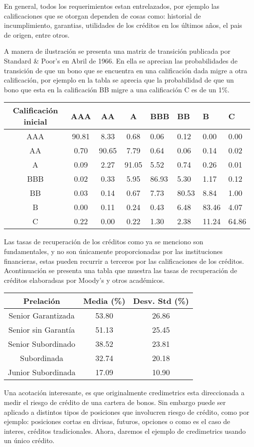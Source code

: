 \documentclass[
  12pt,
]{krantz}
\theoremstyle{definition}
\theoremstyle{definition}
\theoremstyle{definition}
\theoremstyle{remark}
\begin{document}
En general, todos los requerimientos estan entrelazados, por ejemplo las calificaciones que se otorgan dependen de cosas como: historial de incumplimiento, garantias, utilidades de los créditos en los últimos años, el pais de origen, entre otros.

A manera de ilustración se presenta una matriz de transición publicada por Standard \& Poor's en Abril de 1966. En ella se aprecian las probabilidades de transición de que un bono que se encuentra en una calificación dada migre a otra calificación, por ejemplo en la tabla se aprecia que la probabilidad de que un bono que esta en la calificación BB migre a una calificación C es de un 1\%.

\begin{longtable}[]{@{}ccccllll@{}}
\toprule
Calificación inicial & AAA & AA & A & BBB & BB & B & C\tabularnewline
\midrule
\endhead
AAA & 90.81 & 8.33 & 0.68 & 0.06 & 0.12 & 0.00 & 0.00\tabularnewline
AA & 0.70 & 90.65 & 7.79 & 0.64 & 0.06 & 0.14 & 0.02\tabularnewline
A & 0.09 & 2.27 & 91.05 & 5.52 & 0.74 & 0.26 & 0.01\tabularnewline
BBB & 0.02 & 0.33 & 5.95 & 86.93 & 5.30 & 1.17 & 0.12\tabularnewline
BB & 0.03 & 0.14 & 0.67 & 7.73 & 80.53 & 8.84 & 1.00\tabularnewline
B & 0.00 & 0.11 & 0.24 & 0.43 & 6.48 & 83.46 & 4.07\tabularnewline
C & 0.22 & 0.00 & 0.22 & 1.30 & 2.38 & 11.24 & 64.86\tabularnewline
\bottomrule
\end{longtable}

Las tasas de recuperación de los créditos como ya se menciono son fundamentales, y no son únicamente proporcionadas por las instituciones financieras, estas pueden recurrir a terceros por las calificaciones de los créditos. Acontinuación se presenta una tabla que muestra las tasas de recuperación de créditos elaboradsas por Moody's y otros académicos.

\begin{longtable}[]{@{}ccc@{}}
\toprule
Prelación & Media (\%) & Desv. Std (\%)\tabularnewline
\midrule
\endhead
Senior Garantizada & 53.80 & 26.86\tabularnewline
Senior sin Garantía & 51.13 & 25.45\tabularnewline
Senior Subordinado & 38.52 & 23.81\tabularnewline
Subordinada & 32.74 & 20.18\tabularnewline
Junior Subordinada & 17.09 & 10.90\tabularnewline
\bottomrule
\end{longtable}

Una acotación interesante, es que originalmente credimetrics esta direccionada a medir el riesgo de crédito de una cartera de bonos. Sin embargo puede ser aplicado a distintos tipos de posiciones que involucren riesgo de crédito, como por ejemplo: posiciones cortas en divisas, futuros, opciones o como es el caso de interes, créditos tradicionales. Ahora, daremos el ejemplo de credimetrics usando un único crédito.
\end{document}
